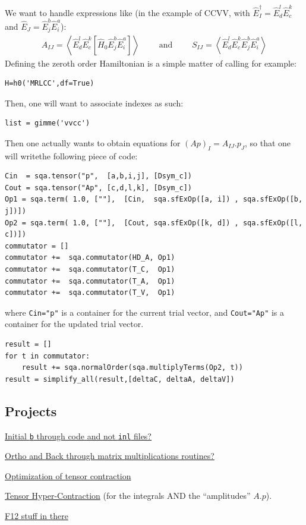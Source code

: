 \documentclass{article}
\newcommand  \equ[2]       {\begin{align}#2\label{#1}\end{align}}
\newcommand  \var[1]       {\texttt{#1}}
\newcommand  \Expect[1]    {\left\langle  #1 \right\rangle}
\newcommand  \E[2]         {\hat{E}_{#1}^{#2}}
\begin{document}
\vspace{.5cm}
\noindent
We want to handle expressions like (in the example of CCVV, with $\hat{E}^\dagger_I =\E{d}{l}\E{c}{k}$ and $\hat{E}_J =\E{j}{b}\E{i}{a}$):
\equ{ }{
  A_{I J }=\Expect{\E{d}{l}\E{c}{k}[\hat{H}_0\E{j}{b}\E{i}{a}]}
  \qquad\text{ and }\qquad
  S_{I J }=\Expect{\E{d}{l}\E{c}{k}\E{j}{b}\E{i}{a}}
}
Defining the zeroth order Hamiltonian is a simple matter of calling for example:
\begin{verbatim}
H=h0('MRLCC',df=True)
\end{verbatim}
Then, one will want to associate indexes as such:
\begin{verbatim}
list = gimme('vvcc')
\end{verbatim}
Then one actually wants to obtain equations for $(Ap)_I  = A_{I J }.p_J $, so that one will writethe following piece of code:
\begin{verbatim}
Cin  = sqa.tensor("p",  [a,b,i,j], [Dsym_c])
Cout = sqa.tensor("Ap", [c,d,l,k], [Dsym_c])
Op1 = sqa.term( 1.0, [""],  [Cin,  sqa.sfExOp([a, i]) , sqa.sfExOp([b, j])])
Op2 = sqa.term( 1.0, [""],  [Cout, sqa.sfExOp([k, d]) , sqa.sfExOp([l, c])])
commutator = []
commutator +=  sqa.commutator(HD_A, Op1)
commutator +=  sqa.commutator(T_C,  Op1)
commutator +=  sqa.commutator(T_A,  Op1)
commutator +=  sqa.commutator(T_V,  Op1)
\end{verbatim}
where \var{Cin="p"} is a container for the current trial vector, and \var{Cout="Ap"} is a container for the updated trial vector.
\begin{verbatim}
result = []
for t in commutator:
    result += sqa.normalOrder(sqa.multiplyTerms(Op2, t))
result = simplify_all(result,[deltaC, deltaA, deltaV])
\end{verbatim}

\subsection{Projects}
\label{sec:projects}

\underline{Initial \var{b} through code and not \var{inl} files?}

\noindent
\underline{Ortho and Back through matrix multiplications routines?}

\noindent
\underline{Optimization of tensor contraction}

\noindent
\underline{Tensor Hyper-Contraction}
(for the integrals AND the ``amplitudes'' $A.p$).

\noindent
\underline{F12 stuff in there}
\end{document}
